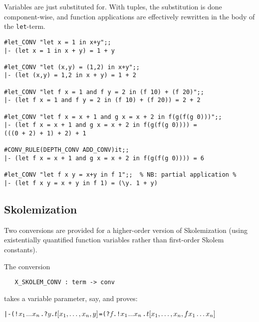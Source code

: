 \noindent Variables are just substituted for. With tuples, the substitution is
done component-wise, and function applications are effectively
rewritten in the body of the {\tt let}-term.

\setcounter{sessioncount}{1}
\begin{session}\begin{verbatim}
#let_CONV "let x = 1 in x+y";;
|- (let x = 1 in x + y) = 1 + y

#let_CONV "let (x,y) = (1,2) in x+y";;
|- (let (x,y) = 1,2 in x + y) = 1 + 2

#let_CONV "let f x = 1 and f y = 2 in (f 10) + (f 20)";;
|- (let f x = 1 and f y = 2 in (f 10) + (f 20)) = 2 + 2

#let_CONV "let f x = x + 1 and g x = x + 2 in f(g(f(g 0)))";;
|- (let f x = x + 1 and g x = x + 2 in f(g(f(g 0)))) =
(((0 + 2) + 1) + 2) + 1

#CONV_RULE(DEPTH_CONV ADD_CONV)it;;
|- (let f x = x + 1 and g x = x + 2 in f(g(f(g 0)))) = 6

#let_CONV "let f x y = x+y in f 1";;  % NB: partial application %
|- (let f x y = x + y in f 1) = (\y. 1 + y)
\end{verbatim}\end{session}

\subsection{Skolemization}

Two conversions are provided for a higher-order version of
Skolemization (using existentially quantified function variables
rather than first-order Skolem constants).

The conversion

\begin{holboxed}
\begin{verbatim}
   X_SKOLEM_CONV : term -> conv
\end{verbatim}\end{holboxed}

\noindent takes a variable parameter,  say, and
proves:

\begin{hol}\begin{alltt}
   |- (!\(x\sb{1}\) \(\ldots\) \(x\sb{n}\). ?\(y\). \(t[x\sb{1},\ldots,x\sb{n},y]\)  =  (?\(f\). !\(x\sb{1}\) \(\ldots\) \(x\sb{n}\). \(t[x\sb{1},\ldots,x\sb{n},f x\sb{1}\ldots x\sb{n}]\)
\end{alltt}\end{hol}

